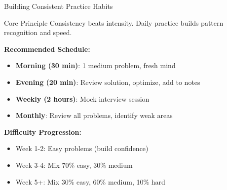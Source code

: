 \documentclass[aspectratio=169,xcolor=dvipsnames]{beamer}
\begin{document}
\begin{frame}{Building Consistent Practice Habits}
  \begin{block}{Core Principle}
    Consistency beats intensity. Daily practice builds pattern recognition and speed.
  \end{block}

  \vspace{0.3cm}
  \textbf{Recommended Schedule:}
  \begin{itemize}
    \item \textbf{Morning (30 min)}: 1 medium problem, fresh mind
    \item \textbf{Evening (20 min)}: Review solution, optimize, add to notes
    \item \textbf{Weekly (2 hours)}: Mock interview session
    \item \textbf{Monthly}: Review all problems, identify weak areas
  \end{itemize}

  \vspace{0.3cm}
  \textbf{Difficulty Progression:}
  \begin{itemize}
    \item Week 1-2: Easy problems (build confidence)
    \item Week 3-4: Mix 70\% easy, 30\% medium
    \item Week 5+: Mix 30\% easy, 60\% medium, 10\% hard
  \end{itemize}
\end{frame}
\end{document}
